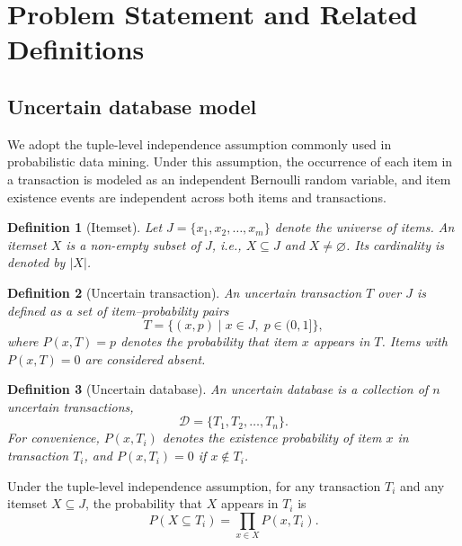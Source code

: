 \documentclass[10pt,letterpaper]{article}
\newtheorem{definition}{Definition}[section]
\newcounter{definition}
\begin{document}
\section*{Problem Statement and Related Definitions}

\subsection*{Uncertain database model}

We adopt the tuple-level independence assumption commonly used in probabilistic data mining. Under this assumption, the occurrence of each item in a transaction is modeled as an independent Bernoulli random variable, and item existence events are independent across both items and transactions.

\begin{definition} [Itemset]
\label{def:itemset}
Let $J=\{x_1,x_2,\ldots,x_m\}$ denote the universe of items. An itemset $X$ is a non-empty subset of $J$, i.e., $X \subseteq J$ and $X \neq \varnothing$. Its cardinality is denoted by $|X|$.
\end{definition}

\begin{definition}[Uncertain transaction]
\label{def:transaction}
An uncertain transaction $T$ over $J$ is defined as a set of item--probability pairs
\begin{equation}
T = \{(x,p) \mid x \in J,\; p \in (0,1]\},
\end{equation}
where $P(x,T)=p$ denotes the probability that item $x$ appears in $T$. Items with $P(x,T)=0$ are considered absent.
\end{definition}

\begin{definition}[Uncertain database]
\label{def:database}
An uncertain database is a collection of $n$ uncertain transactions,
\begin{equation}
\mathcal{D} = \{T_1, T_2, \ldots, T_n\}.
\end{equation}
For convenience, $P(x,T_i)$ denotes the existence probability of item $x$ in transaction $T_i$, and $P(x,T_i)=0$ if $x \notin T_i$.
\end{definition}

Under the tuple-level independence assumption, for any transaction $T_i$ and any itemset $X \subseteq J$, the probability that $X$ appears in $T_i$ is
\begin{equation}
P(X \subseteq T_i) = \prod_{x \in X} P(x,T_i).
\label{eq:itemset_probability}
\end{equation}
\end{document}
